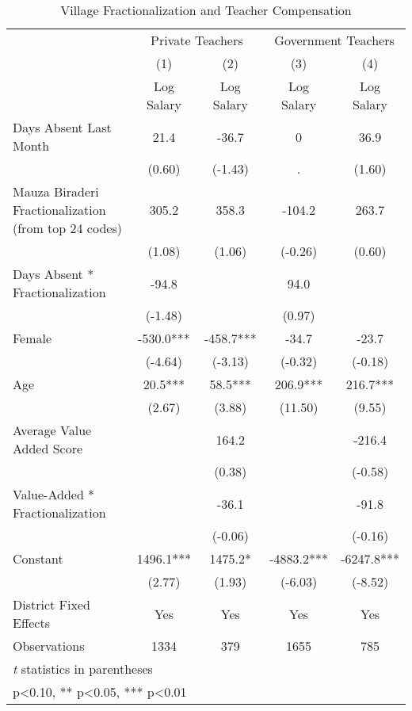 \begin{table}[htbp]\centering
\def\sym#1{\ifmmode^{#1}\else\(^{#1}\)\fi}
\caption{Village Fractionalization and Teacher Compensation\label{teachercompensation}}
\begin{tabular}{l*{4}{c}}
\toprule
                &\multicolumn{2}{c}{Private Teachers}&\multicolumn{2}{c}{Government Teachers}\\\cmidrule(lr){2-3}\cmidrule(lr){4-5}
                &\multicolumn{1}{c}{(1)}&\multicolumn{1}{c}{(2)}&\multicolumn{1}{c}{(3)}&\multicolumn{1}{c}{(4)}\\
                &\multicolumn{1}{c}{Log Salary}&\multicolumn{1}{c}{Log Salary}&\multicolumn{1}{c}{Log Salary}&\multicolumn{1}{c}{Log Salary}\\
\midrule
Days Absent Last Month&     21.4   &    -36.7   &        0   &     36.9   \\
                &   (0.60)   &  (-1.43)   &        .   &   (1.60)   \\
Mauza Biraderi Fractionalization (from top 24 codes)&    305.2   &    358.3   &   -104.2   &    263.7   \\
                &   (1.08)   &   (1.06)   &  (-0.26)   &   (0.60)   \\
Days Absent * Fractionalization&    -94.8   &            &     94.0   &            \\
                &  (-1.48)   &            &   (0.97)   &            \\
Female          &   -530.0***&   -458.7***&    -34.7   &    -23.7   \\
                &  (-4.64)   &  (-3.13)   &  (-0.32)   &  (-0.18)   \\
Age             &     20.5***&     58.5***&    206.9***&    216.7***\\
                &   (2.67)   &   (3.88)   &  (11.50)   &   (9.55)   \\
Average Value Added Score&            &    164.2   &            &   -216.4   \\
                &            &   (0.38)   &            &  (-0.58)   \\
Value-Added * Fractionalization&            &    -36.1   &            &    -91.8   \\
                &            &  (-0.06)   &            &  (-0.16)   \\
Constant        &   1496.1***&   1475.2*  &  -4883.2***&  -6247.8***\\
                &   (2.77)   &   (1.93)   &  (-6.03)   &  (-8.52)   \\
District Fixed Effects&      Yes   &      Yes   &      Yes   &      Yes   \\
\midrule
Observations    &     1334   &      379   &     1655   &      785   \\
\bottomrule
\multicolumn{5}{l}{\footnotesize \textit{t} statistics in parentheses}\\
\multicolumn{5}{l}{\footnotesize * p<0.10, ** p<0.05, *** p<0.01}\\
\end{tabular}
\end{table}
